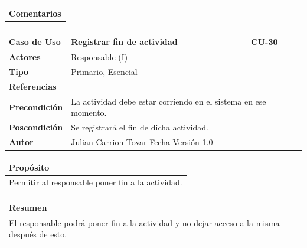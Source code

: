 \vspace{0.2cm}

\begin{table}[h!]
\centering
\begin{tabularx}{\textwidth}{|X|}
\hline
\cellcolor[HTML]{F2F2F2}\textbf{Comentarios} \\ \hline
\\ %
\hline
\end{tabularx}
\end{table}


\begin{table}[h!]
\centering
\begin{tabularx}{\textwidth}{|l|X|X|}
\hline
\textbf{Caso de Uso} & Registrar fin de actividad & CU-30 \\ \hline
\textbf{Actores} & \multicolumn{2}{l|}{Responsable (I)} \\ \hline
\textbf{Tipo} & \multicolumn{2}{l|}{Primario, Esencial} \\ \hline
\textbf{Referencias} & \multicolumn{2}{l|}{} \\ \hline
\textbf{Precondición} & \multicolumn{2}{l|}{La actividad debe estar corriendo en el sistema en ese momento.} \\ \hline
\textbf{Poscondición} & \multicolumn{2}{l|}{Se registrará el fin de dicha actividad.} \\ \hline
\textbf{Autor} & \multicolumn{2}{l|}{Julian Carrion Tovar \hfill Fecha \hfill Versión 1.0} \\ \hline
\end{tabularx}
\end{table}

\vspace{0.2cm}

\begin{table}[h!]
\centering
\begin{tabularx}{\textwidth}{|X|}
\hline
\cellcolor[HTML]{F2F2F2}\textbf{Propósito} \\ \hline
Permitir al responsable poner fin a la actividad. \\ \hline
\end{tabularx}
\end{table}

\vspace{0.2cm}

\begin{table}[h!]
\centering
\begin{tabularx}{\textwidth}{|X|}
\hline
\cellcolor[HTML]{F2F2F2}\textbf{Resumen} \\ \hline
El responsable podrá poner fin a la actividad y no dejar acceso a la misma después de esto. \\ \hline
\end{tabularx}
\end{table}

